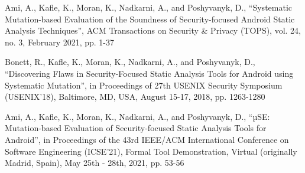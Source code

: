 Ami, A., Kafle, K., Moran, K., Nadkarni, A., and Poshyvanyk, D., “Systematic Mutation-based Evaluation of the Soundness of Security-focused Android Static Analysis Techniques”, ACM Transactions on Security \& Privacy (TOPS), vol. 24, no. 3, February 2021, pp. 1-37

Bonett, R., Kafle, K., Moran, K., Nadkarni, A., and Poshyvanyk, D., “Discovering Flaws in Security-Focused Static Analysis Tools for Android using Systematic Mutation”, in Proceedings of 27th USENIX Security Symposium (USENIX’18), Baltimore, MD, USA, August 15-17, 2018, pp. 1263-1280

Ami, A., Kafle, K., Moran, K., Nadkarni, A., and Poshyvanyk, D., “µSE: Mutation-based Evaluation of Security-focused Static Analysis Tools for Android”, in Proceedings of the 43rd IEEE/ACM International Conference on Software Engineering (ICSE’21), Formal Tool Demonstration, Virtual (originally Madrid, Spain), May 25th - 28th, 2021, pp. 53-56
